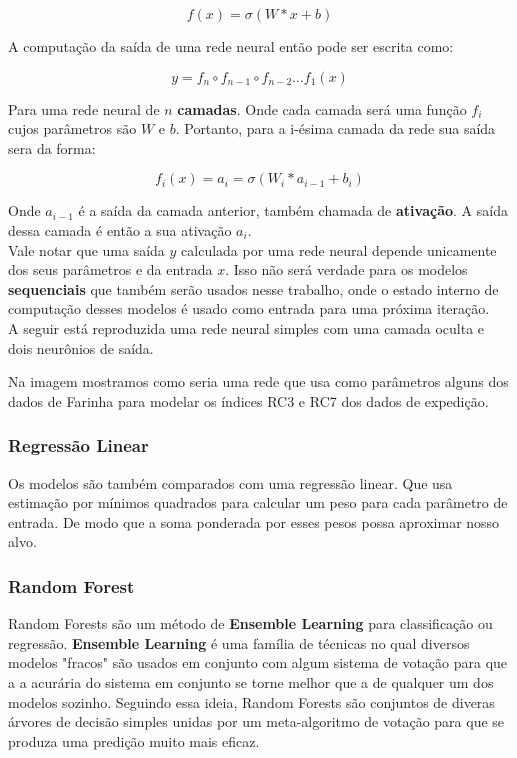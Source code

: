 \[ f(x)=  \sigma(W*x + b) \]

A computação da saída de uma rede neural então pode ser escrita como:

\[   y = f_n \circ f_{n-1} \circ f_{n-2} \dots f_1(x)  \]

Para uma rede neural de $n$ \textbf{camadas}. Onde cada camada será uma função
$f_i$ cujos parâmetros são $W$ e $b$. Portanto, para a i-ésima camada da rede
sua saída sera da forma: 

\[ f_i (x)=  a_i = \sigma(W_i*a_{i-1} + b_i) \]

Onde $a_{i-1}$ é a saída da camada anterior, também chamada de
\textbf{ativação}. A saída dessa camada é então a sua ativação $a_i$. \\ 

Vale notar que uma saída $y$ calculada por uma rede neural depende unicamente dos
seus parâmetros e da entrada $x$. Isso não será verdade para os modelos
\textbf{sequenciais} que também serão usados nesse trabalho, onde o estado
interno de computação desses modelos é usado como entrada para uma próxima
iteração. \\

A seguir está reproduzida uma rede neural simples com uma camada oculta e dois neurônios de saída.


%


Na imagem mostramos como seria uma rede que usa como parâmetros alguns dos dados de Farinha para modelar os índices RC3 e RC7 dos dados de expedição.

\bigskip
\subsubsection{Regressão Linear}
Os modelos são também comparados com uma regressão linear. Que usa estimação por mínimos quadrados para calcular um peso para cada parâmetro de entrada. De modo que a soma ponderada por esses pesos possa aproximar nosso alvo.


\subsubsection{Random Forest}

Random Forests são um método de \textbf{Ensemble Learning} para classificação ou regressão. \textbf{Ensemble Learning} é uma família de técnicas no qual diversos modelos "fracos" são usados em conjunto com algum sistema de votação para que a a acurária do sistema em conjunto se torne melhor que a de qualquer um dos modelos sozinho. Seguindo essa ideia, Random Forests são conjuntos de diveras árvores de decisão simples unidas por um meta-algoritmo de votação para que se produza uma predição muito mais eficaz.


